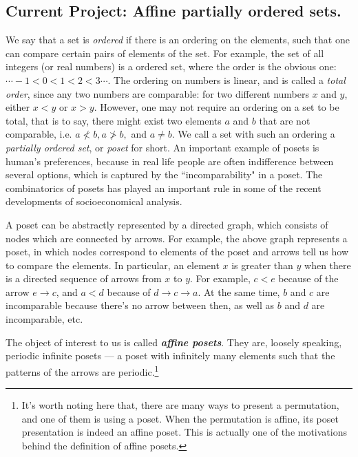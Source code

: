 \documentclass[11pt]{amsart}
\newcommand{\Emph}[1]{\textbf{\emph{#1}}}
\begin{document}
\subsection{Current Project: Affine partially ordered sets.} %
We say that a set is \emph{ordered} if there is an ordering on the elements, such that one can compare certain pairs of elements of the set. For example, the set of all integers (or real numbers) is a ordered set, where the order is the obvious one: $\cdots -1 <0<1<2<3\cdots$. The ordering on numbers is linear, and is called a \emph{total order}, since any two numbers are comparable: for two different numbers $x$ and $y$, either $x<y$ or $x>y$. However, one may not require an ordering on a set to be total, that is to say, there might exist two elements $a$ and $b$ that are not comparable, i.e. $a\not <b, a\not >b,$ and $a\neq b$. We call a set with such an ordering a \emph{partially ordered set}, or \emph{poset} for short. An important example of posets is human's preferences, because in real life people are often indifference between several options, which is captured by the ``incomparability" in a poset. The combinatorics of posets has played an important rule in some of the recent developments of socioeconomical analysis.
\begin{center}
\end{center}

A poset can be abstractly represented by a directed graph, which consists of nodes which are connected by arrows. For example, the above graph represents a poset, in which nodes correspond to elements of the poset and arrows tell us how to compare the elements. In particular, an element $x$ is greater than $y$ when there is a directed sequence of arrows from $x$ to $y$.
For example, $c<e$ because of the arrow $e\to c$, and $a<d$ because of $d\to c\to a$. At the same time, $b$ and $c$ are incomparable because there's no arrow between then, as well as $b$ and $d$ are incomparable, etc.

The object of interest to us is called \Emph{affine posets}. They are, loosely speaking, periodic infinite posets --- a poset with infinitely many elements such that the patterns of the arrows are periodic.\footnote{It's worth noting here that, there are many ways to present a permutation, and one of them is using a poset. When the permutation is affine, its poset presentation is indeed an affine poset. This is actually one of the motivations behind the definition of affine posets.} 
\end{document}
